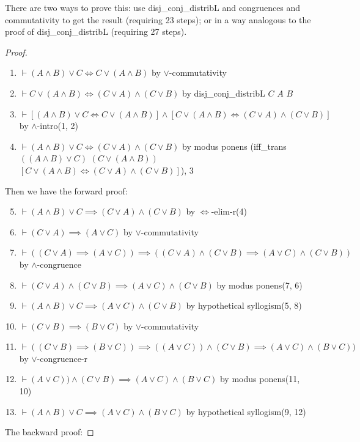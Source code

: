 There are two ways to prove this: use {\Tt{}disj{\_}conj{\_}distribL\nwendquote} and
congruences and commutativity to get the result (requiring 23 steps); or in a way analogous
to the proof of {\Tt{}disj{\_}conj{\_}distribL\nwendquote} (requiring 27 steps). 

\begin{proof}
\begin{enumerate}
\item $\vdash (A\land B)\lor C\iff C\lor(A\land B)$ by $\lor$-commutativity
\item $\vdash C\lor(A\land B)\iff (C\lor A)\land(C\lor B)$ by {\Tt{}disj{\_}conj{\_}distribL\nwendquote} $C$ $A$ $B$
\item $\vdash[(A\land B)\lor C\iff C\lor(A\land B)]\land[C\lor(A\land B)\iff (C\lor A)\land(C\lor B)]$ by $\land$-intro(1, 2)%
\item $\vdash(A\land B)\lor C\iff (C\lor A)\land(C\lor B)$ by modus ponens ({\Tt{}iff{\_}trans\nwendquote}
$((A\land B)\lor C)$ $(C\lor(A\land B))$ $[C\lor(A\land B)\iff (C\lor A)\land(C\lor B)]$),
3%
\end{enumerate}
\bigbreak
Then we have the forward proof:
\begin{enumerate}\setcounter{enumi}{4}
\item $\vdash(A\land B)\lor C\implies (C\lor A)\land(C\lor B)$ by $\Leftrightarrow$-elim-r(4)%
\item $\vdash(C\lor A)\implies(A\lor C)$ by $\lor$-commutativity%
\item $\vdash((C\lor A)\implies(A\lor C))\implies((C\lor A)\land(C\lor B)\implies(A\lor C)\land(C\lor B))$
  by $\land$-congruence%
\item $\vdash(C\lor A)\land(C\lor B)\implies(A\lor C)\land(C\lor B)$
  by modus ponens(7, 6)%
\item $\vdash(A\land B)\lor C\implies (A\lor C)\land(C\lor B)$
  by hypothetical syllogism(5, 8)%
\item $\vdash(C\lor B)\implies(B\lor C)$ by $\lor$-commutativity%
\item $\vdash((C\lor B)\implies(B\lor C))\implies((A\lor
  C))\land(C\lor B)\implies(A\lor C)\land(B\lor C))$
  by $\lor$-congruence-r%
\item $\vdash (A\lor C))\land(C\lor B)\implies(A\lor C)\land(B\lor C)$
  by modus ponens(11, 10)%
\item $\vdash(A\land B)\lor C\implies (A\lor C)\land(B\lor C)$
  by hypothetical syllogism(9, 12)%
\end{enumerate}
\bigbreak
The backward proof:

\end{proof}
